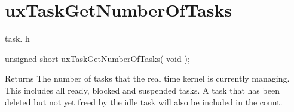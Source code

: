 \hypertarget{group__uxTaskGetNumberOfTasks}{}\section{ux\+Task\+Get\+Number\+Of\+Tasks}
\label{group__uxTaskGetNumberOfTasks}
task. h 
\begin{DoxyPre}unsigned short \hyperlink{task_8h_a824dbbcd7c7fd3be20540b23ff39f2aa}{uxTaskGetNumberOfTasks( void )};\end{DoxyPre}


\begin{DoxyReturn}{Returns}
The number of tasks that the real time kernel is currently managing. This includes all ready, blocked and suspended tasks. A task that has been deleted but not yet freed by the idle task will also be included in the count. 
\end{DoxyReturn}
